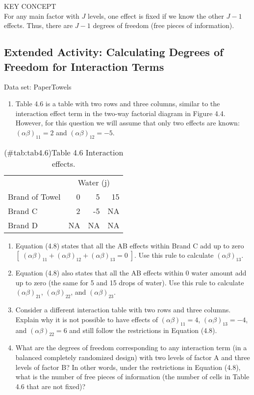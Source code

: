 \documentclass[
]{report}
\providecommand{\tightlist}{%
  \setlength{\itemsep}{0pt}\setlength{\parskip}{0pt}}
\begin{document}
KEY CONCEPT\\
For any main factor with \(J\) levels, one effect is fixed if we know the other \(J-1\) effects. Thus, there are \(J-1\) degrees of freedom (free pieces of information).

\subsection{Extended Activity: Calculating Degrees of Freedom for Interaction Terms}\label{extended-activity-calculating-degrees-of-freedom-for-interaction-terms}

Data set: PaperTowels

\begin{enumerate}
\def\labelenumi{\arabic{enumi}.}
\setcounter{enumi}{30}
\tightlist
\item
  Table 4.6 is a table with two rows and three columns, similar to the interaction effect term in the two-way factorial diagram in Figure 4.4. However, for this question we will assume that only two effects are known: \((\alpha\beta)_{11}=2\) and \((\alpha\beta)_{12}=-5\).
\end{enumerate}

\begin{table}[!h]
\centering
\caption{(\#tab:tab4.6)Table 4.6 Interaction effects.}
\centering
\begin{tabular}[t]{lrrr}
\toprule
\multicolumn{1}{c}{ } & \multicolumn{3}{c}{Water (j)} \\
\cmidrule(l{3pt}r{3pt}){2-4}
Brand of Towel & 0 & 5 & 15\\
\midrule
Brand C & 2 & -5 & NA\\
Brand D & NA & NA & NA\\
\bottomrule
\end{tabular}
\end{table}

\begin{enumerate}
\def\labelenumi{\alph{enumi}.}
\item
  Equation (4.8) states that all the AB effects within Brand C add up to zero \([\;(\alpha\beta)_{11} + (\alpha\beta)_{12} + (\alpha\beta)_{13} = 0\;]\). Use this rule to calculate \((\alpha\beta)_{13}\).
\item
  Equation (4.8) also states that all the AB effects within 0 water amount add up to zero (the same for 5 and 15 drops of water). Use this rule to calculate \((\alpha\beta)_{21}\), \((\alpha\beta)_{22}\), and \((\alpha\beta)_{23}\).
\item
  Consider a different interaction table with two rows and three columns. Explain why it is not possible to have effects of \((\alpha\beta)_{11}=4\), \((\alpha\beta)_{13}=-4\), and \((\alpha\beta)_{22}=6\) and still follow the restrictions in Equation (4.8).
\item
  What are the degrees of freedom corresponding to any interaction term (in a balanced completely randomized design) with two levels of factor A and three levels of factor B? In other words, under the restrictions in Equation (4.8), what is the number of free pieces of information (the number of cells in Table 4.6 that are not fixed)?
\end{enumerate}
\end{document}
